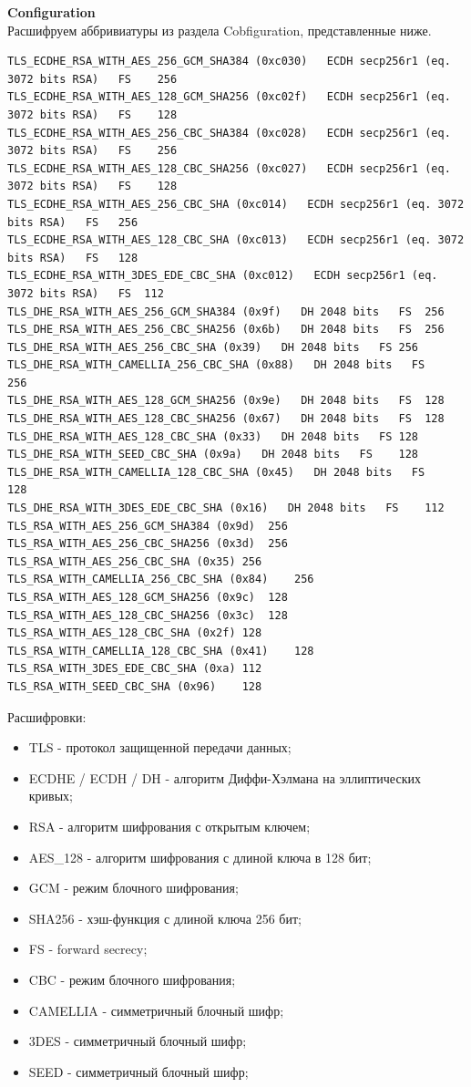 \documentclass[10pt,a4paper,titlepage]{article}
\begin{document}
\textbf{Configuration}\\

Расшифруем аббривиатуры из раздела Cobfiguration, представленные ниже.

\begin{verbatim}
TLS_ECDHE_RSA_WITH_AES_256_GCM_SHA384 (0xc030)   ECDH secp256r1 (eq. 3072 bits RSA)   FS	256
TLS_ECDHE_RSA_WITH_AES_128_GCM_SHA256 (0xc02f)   ECDH secp256r1 (eq. 3072 bits RSA)   FS	128
TLS_ECDHE_RSA_WITH_AES_256_CBC_SHA384 (0xc028)   ECDH secp256r1 (eq. 3072 bits RSA)   FS	256
TLS_ECDHE_RSA_WITH_AES_128_CBC_SHA256 (0xc027)   ECDH secp256r1 (eq. 3072 bits RSA)   FS	128
TLS_ECDHE_RSA_WITH_AES_256_CBC_SHA (0xc014)   ECDH secp256r1 (eq. 3072 bits RSA)   FS	256
TLS_ECDHE_RSA_WITH_AES_128_CBC_SHA (0xc013)   ECDH secp256r1 (eq. 3072 bits RSA)   FS	128
TLS_ECDHE_RSA_WITH_3DES_EDE_CBC_SHA (0xc012)   ECDH secp256r1 (eq. 3072 bits RSA)   FS	112
TLS_DHE_RSA_WITH_AES_256_GCM_SHA384 (0x9f)   DH 2048 bits   FS	256
TLS_DHE_RSA_WITH_AES_256_CBC_SHA256 (0x6b)   DH 2048 bits   FS	256
TLS_DHE_RSA_WITH_AES_256_CBC_SHA (0x39)   DH 2048 bits   FS	256
TLS_DHE_RSA_WITH_CAMELLIA_256_CBC_SHA (0x88)   DH 2048 bits   FS	256
TLS_DHE_RSA_WITH_AES_128_GCM_SHA256 (0x9e)   DH 2048 bits   FS	128
TLS_DHE_RSA_WITH_AES_128_CBC_SHA256 (0x67)   DH 2048 bits   FS	128
TLS_DHE_RSA_WITH_AES_128_CBC_SHA (0x33)   DH 2048 bits   FS	128
TLS_DHE_RSA_WITH_SEED_CBC_SHA (0x9a)   DH 2048 bits   FS	128
TLS_DHE_RSA_WITH_CAMELLIA_128_CBC_SHA (0x45)   DH 2048 bits   FS	128
TLS_DHE_RSA_WITH_3DES_EDE_CBC_SHA (0x16)   DH 2048 bits   FS	112
TLS_RSA_WITH_AES_256_GCM_SHA384 (0x9d)	256
TLS_RSA_WITH_AES_256_CBC_SHA256 (0x3d)	256
TLS_RSA_WITH_AES_256_CBC_SHA (0x35)	256
TLS_RSA_WITH_CAMELLIA_256_CBC_SHA (0x84)	256
TLS_RSA_WITH_AES_128_GCM_SHA256 (0x9c)	128
TLS_RSA_WITH_AES_128_CBC_SHA256 (0x3c)	128
TLS_RSA_WITH_AES_128_CBC_SHA (0x2f)	128
TLS_RSA_WITH_CAMELLIA_128_CBC_SHA (0x41)	128
TLS_RSA_WITH_3DES_EDE_CBC_SHA (0xa)	112
TLS_RSA_WITH_SEED_CBC_SHA (0x96)	128
\end{verbatim}

Расшифровки:
\begin{itemize}
\item TLS - протокол защищенной передачи данных;
\item ECDHE / ECDH / DH - алгоритм Диффи-Хэлмана на эллиптических кривых;
\item RSA - алгоритм шифрования с открытым ключем;
\item AES\_128 - алгоритм шифрования с длиной ключа в 128 бит;
\item GCM - режим блочного шифрования;
\item SHA256 - хэш-функция с длиной ключа 256 бит;
\item FS - forward secrecy;
\item CBC - режим блочного шифрования;
\item CAMELLIA - симметричный блочный шифр;
\item 3DES - симметричный блочный шифр;
\item SEED - симметричный блочный шифр;
\end{itemize}
\end{document}
